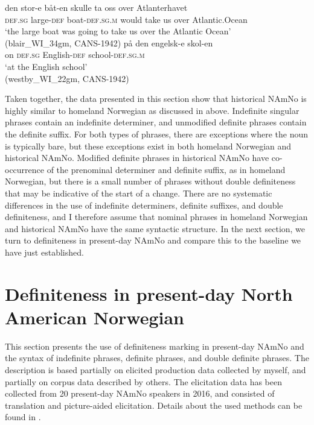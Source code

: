 \documentclass[output=paper]{langscibook}
\begin{document}
\ea \label{ex:vanbaal:17}
\ea \label{ex:vanbaal:17a}
\gll den stor-e båt-en skulle ta oss over Atlanterhavet \\
\textsc{def.sg} large-\textsc{def} boat-\textsc{def.sg.m} would take us over Atlantic.Ocean \\
\glt `the large boat was going to take us over the Atlantic Ocean' \\
(blair\_WI\_34gm, CANS-1942)
\ex\label{ex:vanbaal:17b}
\gll på den engelsk-e skol-en \\
on \textsc{def.sg} English-\textsc{def} school-\textsc{def.sg.m} \\
\glt `at the English school' \\
(westby\_WI\_22gm, CANS-1942)
\z
\z

Taken together, the data presented in this section show that historical NAmNo is highly similar to homeland Norwegian as discussed in  above. Indefinite singular phrases contain an indefinite determiner, and unmodified definite phrases contain the definite suffix. For both types of phrases, there are exceptions where the noun is typically bare, but these exceptions exist in both homeland Norwegian and historical NAmNo. Modified definite phrases in historical NAmNo have co-occurrence of the prenominal determiner and definite suffix, as in homeland Norwegian, but there is a small number of phrases without double definiteness that may be indicative of the start of a change. There are no systematic differences in the use of indefinite determiners, definite suffixes, and double definiteness, and I therefore assume that nominal phrases in homeland Norwegian and historical NAmNo have the same syntactic structure. In the next section, we turn to definiteness in present-day NAmNo and compare this to the baseline we have just established.
 

\section{Definiteness in present-day North American Norwegian} \label{Sect-PresentdayAmNo}
This section presents the use of definiteness marking in present-day NAmNo and the syntax of indefinite phrases, definite phrases, and double definite phrases. The description is based partially on elicited production data collected by myself, and partially on corpus data described by others. The elicitation data has been collected from 20 present-day NAmNo speakers in 2016, and consisted of translation and picture-aided elicitation. Details about the used methods can be found in \citet[chapter 4]{vanBaal2020}.
  
\end{document}
